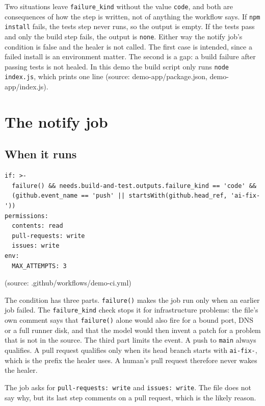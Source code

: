 Two situations leave \texttt{failure\_\allowbreak{}kind} without the value \texttt{code}, and both are consequences of how the step is written, not of anything the workflow says. If \texttt{npm install} fails, the tests step never runs, so the output is empty. If the tests pass and only the build step fails, the output is \texttt{none}. Either way the notify job's condition is false and the healer is not called. The first case is intended, since a failed install is an environment matter. The second is a gap: a build failure after passing tests is not healed. In this demo the build script only runs \texttt{node index.\allowbreak{}js}, which prints one line (source: demo-app/\allowbreak{}package.json, demo-app/\allowbreak{}index.js).

\section{The notify job}

\subsection{When it runs}

\begin{lstlisting}
if: >-
  failure() && needs.build-and-test.outputs.failure_kind == 'code' &&
  (github.event_name == 'push' || startsWith(github.head_ref, 'ai-fix-'))
permissions:
  contents: read
  pull-requests: write
  issues: write
env:
  MAX_ATTEMPTS: 3
\end{lstlisting}

(source: .github/\allowbreak{}workflows/\allowbreak{}demo-ci.yml)

The condition has three parts. \texttt{failure()} makes the job run only when an earlier job failed. The \texttt{failure\_\allowbreak{}kind} check stops it for infrastructure problems: the file's own comment says that \texttt{failure()} alone would also fire for a bound port, DNS or a full runner disk, and that the model would then invent a patch for a problem that is not in the source. The third part limits the event. A push to \texttt{main} always qualifies. A pull request qualifies only when its head branch starts with \texttt{ai-\allowbreak{}fix-\allowbreak{}}, which is the prefix the healer uses. A human's pull request therefore never wakes the healer.

The job asks for \texttt{pull-\allowbreak{}requests:\allowbreak{} write} and \texttt{issues:\allowbreak{} write}. The file does not say why, but its last step comments on a pull request, which is the likely reason.

